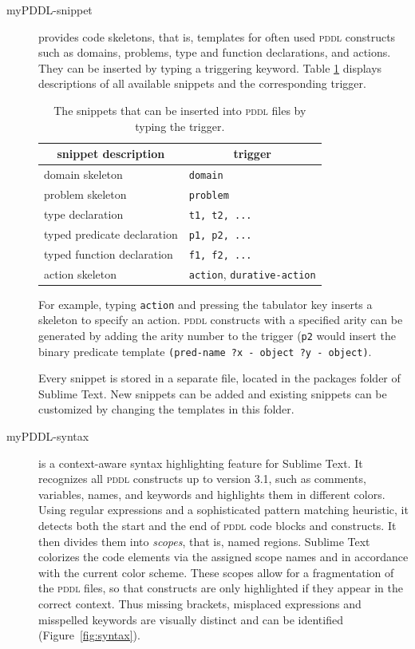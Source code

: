 \documentclass[runningheads]{llncs}
\newcommand{\tableheadline}[1]{\multicolumn{1}{c}{#1}}
\newcommand{\mypddl}{\textsc{myPddl}\xspace}
\newcommand{\pddl}{\textsc{pddl}\xspace}
\newcommand{\sublimetext}{Sublime Text\xspace}
\begin{document}
\begin{description}
\item[myPDDL-snippet] provides code skeletons, that is, templates for
  often used \pddl constructs such as domains, problems, type and
  function declarations, and actions. They can be inserted by typing a
  triggering keyword. Table \ref{tab:snippets} displays descriptions
  of all available snippets and the corresponding trigger.

\begin{table}[htb]
  \centering
  \caption[Available snippets in \mypddl-snippet]{\label{tab:snippets}The snippets that can be inserted into \pddl files by typing the trigger.}
\begin{tabular}{ll}
  \tableheadline{snippet description} & \tableheadline{trigger}                   \\
  \hline
  domain skeleton                     & \texttt{domain}                           \\
  problem skeleton                    & \texttt{problem}                          \\
  type declaration                    & \texttt{t1, t2, ...}                      \\
  typed predicate declaration         & \texttt{p1, p2, ...}                     \\ 
  typed function declaration          & \texttt{f1, f2, ...}                     \\
  action skeleton                     & \texttt{action}, \texttt{durative-action} \\
\end{tabular}
\end{table}

For example, typing \texttt{action} and pressing the tabulator key
inserts a skeleton to specify an action. \pddl constructs with a
specified arity can be generated by adding the arity number to the
trigger (\texttt{p2} would insert the binary predicate template
\texttt{(pred-name~?x~-~object~?y~-~object)}.

Every snippet is stored in a separate file, located in the packages
folder of Sublime Text. New snippets can be added and existing
snippets can be customized by changing the templates in this folder.

  
\item[myPDDL-syntax] is a context-aware syntax highlighting feature
  for \sublimetext. It recognizes all \pddl constructs up to version
  3.1, such as comments, variables, names, and keywords and highlights
  them in different colors. Using regular expressions and a
  sophisticated pattern matching heuristic, it detects both the start
  and the end of \pddl code blocks and constructs. It then divides
  them into \emph{scopes}, that is, named regions. \sublimetext
  colorizes the code elements via the assigned scope names and in
  accordance with the current color scheme. These scopes allow for a
  fragmentation of the \pddl files, so that constructs are only
  highlighted if they appear in the correct context. Thus missing
  brackets, misplaced expressions and misspelled keywords are visually
  distinct and can be identified (Figure~\ref{fig:syntax}).


\end{description}
\end{document}
